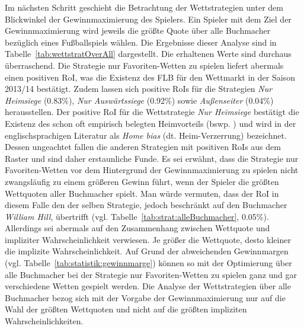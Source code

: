 Im nächsten Schritt geschieht die Betrachtung der Wettstrategien unter dem Blickwinkel der Gewinnmaximierung des Spielers. Ein Spieler mit dem Ziel der Gewinnmaximierung wird jeweils die größte Quote über alle Buchmacher bezüglich eines Fußballspiels wählen. Die Ergebnisse dieser Analyse sind in Tabelle~\ref{tab:wettstratOverAll} dargestellt. Die erhaltenen Werte sind durchaus überraschend. Die Strategie nur Favoriten-Wetten zu spielen liefert abermals einen positiven RoI, was die Existenz des FLB für den Wettmarkt in der Saison 2013/14 bestätigt. Zudem lassen sich positive RoIs für die Strategien \textit{Nur Heimsiege} (0.83\%), \textit{Nur Auswärtssiege} (0.92\%) sowie \textit{Außenseiter} (0.04\%) herausstellen. Der positive RoI für die Wettstrategie \textit{Nur Heimsiege} bestätigt die Existenz des schon oft empirisch belegten Heimvorteils (bswp. \citet{clarke1995home}) und wird in der englischsprachigen Literatur als \textit{Home bias} (dt. Heim-Verzerrung) bezeichnet. Dessen ungeachtet fallen die anderen Strategien mit positiven RoIs aus dem Raster und sind daher erstaunliche Funde. Es sei erwähnt, dass die Strategie nur Favoriten-Wetten vor dem Hintergrund der Gewinnmaximierung zu spielen nicht zwangsläufig zu einem größeren Gewinn führt, wenn der Spieler die größten Wettquoten aller Buchmacher spielt. Man würde vermuten, dass der RoI in diesem Falle den der selben Strategie, jedoch beschränkt auf den Buchmacher \textit{William Hill}, übertrifft (vgl. Tabelle~\ref{tab:strat:alleBuchmacher}, 0.05\%). Allerdings sei abermals auf den Zusammenhang zwischen Wettquote und impliziter Wahrscheinlichkeit verwiesen. Je größer die Wettquote, desto kleiner die implizite Wahrscheinlichkeit. Auf Grund der abweichenden Gewinnmargen (vgl. Tabelle~\ref{tab:statistik:gewinnmarge}) können so mit der Optimierung über alle Buchmacher bei der Strategie nur Favoriten-Wetten zu spielen ganz und gar verschiedene Wetten gespielt werden. Die Analyse der Wettstrategien über alle Buchmacher bezog sich mit der Vorgabe der Gewinnmaximierung nur auf die Wahl der größten Wettquoten und nicht auf die größten impliziten Wahrscheinlichkeiten.

